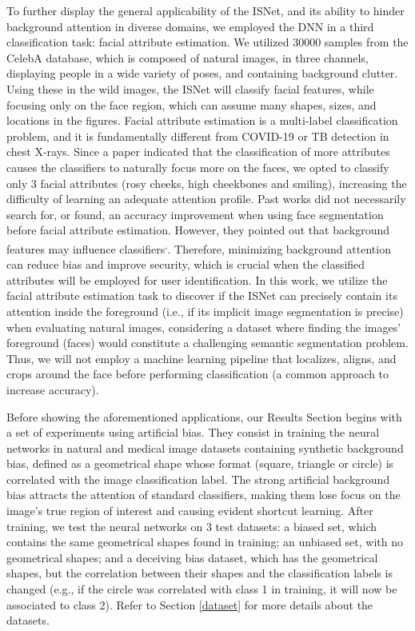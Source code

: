 \documentclass[fleqn,10pt]{wlscirep}
\begin{document}
To further display the general applicability of the ISNet, and its ability to hinder background attention in diverse domains, we employed the DNN in a third classification task: facial attribute estimation. We utilized 30000 samples from the CelebA database\cite{celebA}, which is composed of natural images, in three channels, displaying people in a wide variety of poses, and containing background clutter. Using these in the wild images, the ISNet will classify facial features, while focusing only on the face region, which can assume many shapes, sizes, and locations in the figures. Facial attribute estimation is a multi-label classification problem, and it is fundamentally different from COVID-19  or TB detection in chest X-rays. Since a paper\cite{celebA} indicated that the classification of more attributes causes the classifiers to naturally focus more on the faces, we opted to classify only 3 facial attributes (rosy cheeks, high cheekbones and smiling), increasing the difficulty of learning an adequate attention profile. Past works did not necessarily search for, or found, an accuracy improvement when using face segmentation before facial attribute estimation. However, they pointed out that background features may influence classifiers\cite{FaceBias}\textsuperscript{,}\cite{FacesSmallSets}. Therefore, minimizing background attention can reduce bias and improve security, which is crucial when the classified attributes will be employed for user identification\cite{FaceBias}. In this work, we utilize the facial attribute estimation task to discover if the ISNet can precisely contain its attention inside the foreground (i.e., if its implicit image segmentation is precise) when evaluating natural images, considering a dataset where finding the images' foreground (faces) would constitute a challenging semantic segmentation problem. Thus, we will not employ a machine learning pipeline that localizes, aligns, and crops around the face before performing classification (a common approach to increase accuracy\cite{celebA}).

Before showing the aforementioned applications, our Results Section begins with a set of experiments using artificial bias. They consist in training the neural networks in natural and medical image datasets containing synthetic background bias, defined as a geometrical shape whose format (square, triangle or circle) is correlated with the image classification label. The strong artificial background bias attracts the attention of standard classifiers, making them lose focus on the image's true region of interest and causing evident shortcut learning. After training, we test the neural networks on 3 test datasets: a biased set, which contains the same geometrical shapes found in training; an unbiased set, with no geometrical shapes; and a deceiving bias dataset, which has the geometrical shapes, but the correlation between their shapes and the classification labels is changed (e.g., if the circle was correlated with class 1 in training, it will now be associated to class 2). Refer to Section \ref{dataset} for more details about the datasets.
\end{document}
